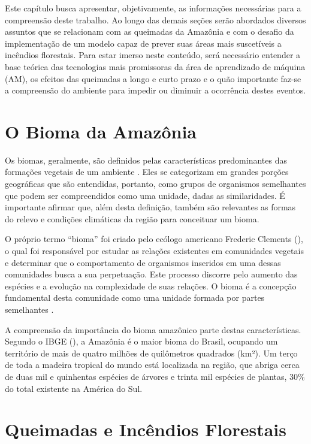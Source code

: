\documentclass[tcc2]{uftex}
\begin{document}
Este capítulo busca apresentar, objetivamente, as informações necessárias para a compreensão deste trabalho. Ao longo das demais seções serão abordados diversos assuntos que se relacionam com as queimadas da Amazônia e com o desafio da implementação de um modelo capaz de prever suas áreas mais suscetíveis a incêndios florestais. Para estar imerso neste conteúdo, será necessário entender a base teórica das tecnologias mais promissoras da área de aprendizado de máquina (AM), os efeitos das queimadas a longo e curto prazo e o quão importante faz-se a compreensão do ambiente para impedir ou diminuir a ocorrência destes eventos.

\section{O Bioma da Amazônia}

Os biomas, geralmente, são definidos pelas características predominantes das formações vegetais de um ambiente \cite{TIMM05}. Eles se categorizam em grandes porções geográficas que são entendidas, portanto, como grupos de organismos semelhantes que podem ser compreendidos como uma unidade, dadas as similaridades. É importante afirmar que, além desta definição, também são relevantes as formas do relevo e condições climáticas da região para conceituar um bioma.

O próprio termo ``bioma'' foi criado pelo ecólogo americano Frederic Clements (\citeyear{clements1916}), o qual foi responsável por estudar as relações existentes em comunidades vegetais e determinar que o comportamento de organismos inseridos em uma dessas comunidades busca a sua perpetuação. Este processo discorre pelo aumento das espécies e a evolução na complexidade de suas relações. O bioma é a concepção fundamental desta comunidade como uma unidade formada por partes semelhantes \cite{TIMM05}.

A compreensão da importância do bioma amazônico parte destas características. Segundo o IBGE (\citeyear{ibge04:mapabioma}), a Amazônia é o maior bioma do Brasil, ocupando um território de mais de quatro milhões de quilômetros quadrados (km²). Um terço de toda a madeira tropical do mundo está localizada na região, que abriga cerca de duas mil e quinhentas espécies de árvores e trinta mil espécies de plantas, 30\% do total existente na América do Sul.

\section{Queimadas e Incêndios Florestais}
\end{document}
